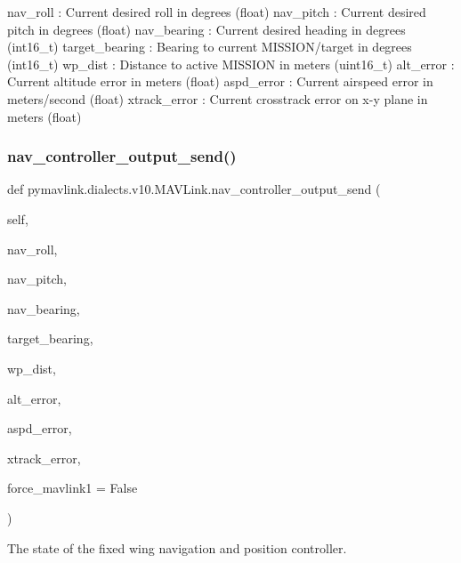 \begin{DoxyVerb}
\begin{DoxyVerb}
\begin{DoxyVerb}
\begin{DoxyVerb}
\begin{DoxyVerb}
nav_roll                  : Current desired roll in degrees (float)
nav_pitch                 : Current desired pitch in degrees (float)
nav_bearing               : Current desired heading in degrees (int16_t)
target_bearing            : Bearing to current MISSION/target in degrees (int16_t)
wp_dist                   : Distance to active MISSION in meters (uint16_t)
alt_error                 : Current altitude error in meters (float)
aspd_error                : Current airspeed error in meters/second (float)
xtrack_error              : Current crosstrack error on x-y plane in meters (float)\end{DoxyVerb}
 \mbox{\label{classpymavlink_1_1dialects_1_1v10_1_1MAVLink_a06e03c33418b456391d5e27839ef8f74}} 
\subsubsection{\texorpdfstring{nav\+\_\+controller\+\_\+output\+\_\+send()}{nav\_controller\_output\_send()}}
{\footnotesize\ttfamily def pymavlink.\+dialects.\+v10.\+M\+A\+V\+Link.\+nav\+\_\+controller\+\_\+output\+\_\+send (\begin{DoxyParamCaption}\item[{}]{self,  }\item[{}]{nav\+\_\+roll,  }\item[{}]{nav\+\_\+pitch,  }\item[{}]{nav\+\_\+bearing,  }\item[{}]{target\+\_\+bearing,  }\item[{}]{wp\+\_\+dist,  }\item[{}]{alt\+\_\+error,  }\item[{}]{aspd\+\_\+error,  }\item[{}]{xtrack\+\_\+error,  }\item[{}]{force\+\_\+mavlink1 = {\ttfamily False} }\end{DoxyParamCaption})}

\begin{DoxyVerb}The state of the fixed wing navigation and position controller.


\end{DoxyVerb}
\end{DoxyVerb}
\end{DoxyVerb}
\end{DoxyVerb}
\end{DoxyVerb}
